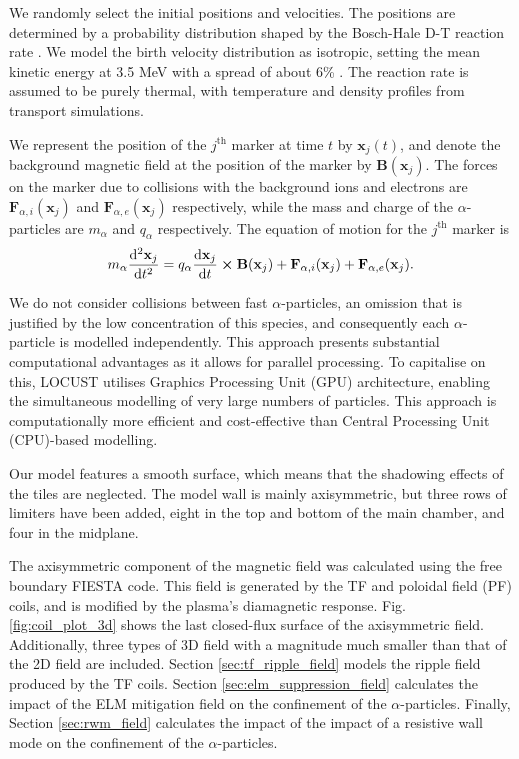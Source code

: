 \documentclass[10pt, a4paper, twoside]{article}
\begin{document}
We randomly select the initial positions and velocities. The positions are determined by a probability distribution shaped by the Bosch-Hale D-T reaction rate \cite{bosch1992}. We model the birth velocity distribution as isotropic, setting the mean kinetic energy at 3.5 MeV with a spread of about 6\% \cite{brysk1973}. The reaction rate is assumed to be purely thermal, with temperature and density profiles from transport simulations.

We represent the position of the $j^{\text{th}}$ marker at time $t$ by $\mathbf{x}_j(t)$, and denote
the background magnetic field at the position of the marker by $\textbf{B}(\mathbf{x}_j)$.
The forces on the marker due to collisions with the background ions and electrons are $\textbf{F}_{\alpha,i}(\mathbf{x}_j)$ and $\textbf{F}_{\alpha,e}(\mathbf{x}_j)$ respectively, while the mass and charge of the $\alpha$-particles are $m_\alpha$ and $q_\alpha$ respectively. The equation of motion for the $j^{\text{th}}$ marker is
\begin{equation}
m_\alpha\dv[2]{\mathbf{x}_j}{t} = q_\alpha\dv{\mathbf{x}_j}{t}\cross\textbf{B}(\mathbf{x}_j) + \textbf{F}_{\alpha,i}(\mathbf{x}_j) + \textbf{F}_{\alpha,e}(\mathbf{x}_j).
\end{equation}

We do not consider collisions between fast $\alpha$-particles, an omission that is justified by the low concentration of this species, and consequently each $\alpha$-particle is modelled independently. This approach presents substantial computational advantages as it allows for parallel processing. To capitalise on this, LOCUST utilises Graphics Processing Unit (GPU) architecture, enabling the simultaneous modelling of very large numbers of particles. This approach is computationally more efficient and cost-effective than Central Processing Unit (CPU)-based modelling. 

Our model features a smooth surface, which means that the shadowing effects of the tiles are neglected. The model wall is mainly axisymmetric, but three rows of limiters have been added, eight in the top and bottom of the main chamber, and four in the midplane. 

The axisymmetric component of the magnetic field was calculated using the free boundary FIESTA code. This field is generated by the TF and poloidal field (PF) coils, and is modified by the plasma's diamagnetic response. Fig. \ref{fig:coil_plot_3d} shows the last closed-flux surface of the axisymmetric field. Additionally, three types of 3D field with a magnitude much smaller than that of the 2D field are included. Section \ref{sec:tf_ripple_field} models the ripple field produced by the TF coils. Section \ref{sec:elm_suppression_field} calculates the impact of the ELM mitigation field on the confinement of the $\alpha$-particles. Finally, Section \ref{sec:rwm_field} calculates the impact of the impact of a resistive wall mode on the confinement of the $\alpha$-particles.
\end{document}
